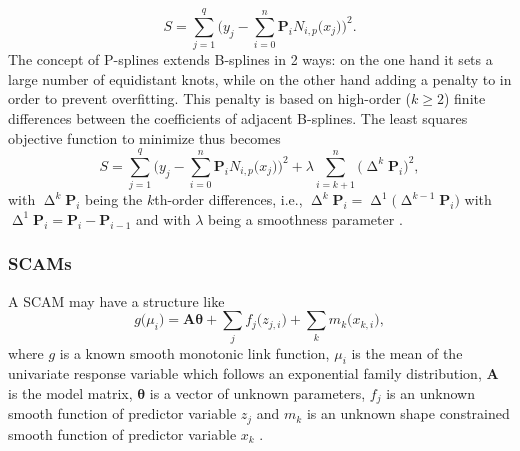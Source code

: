 \begin{equation}
  \label{eq:BSplineOLS}
  S =
  \sum_{j = 1}^q 
  \Biggl(
  y_j - \sum_{i = 0}^n \symbf{P}_i N_{i, p}\bigl(x_j\bigr)
  \Biggr)^2.
\end{equation}
The concept of P-splines extends B-splines in 2 ways: on the one hand it sets a large number of equidistant knots, while on the other hand adding a penalty to  in order to prevent overfitting.  This penalty is based on high-order (\(k \geq 2\)) finite differences between the coefficients of adjacent B-splines.  The least squares objective function to minimize thus becomes
\begin{equation}
  \label{eq:PSplineOLS}
  S =
  \sum_{j = 1}^q 
  \Biggl(
  y_j - \sum_{i = 0}^n \symbf{P}_i N_{i, p}\bigl(x_j\bigr)
  \Biggr)^2
  + \lambda \sum_{i = k + 1}^n \bigl(\upDelta^k \symbf{P}_i\bigr)^2,
\end{equation}
with \(\upDelta^k \symbf{P}_i\) being the \(k\)th-order differences, i.e., \(\upDelta^k\symbf{P}_i = \upDelta^1 \bigl(\upDelta^{k - 1} \symbf{P}_i\bigr)\) with \(\upDelta^1 \symbf{P}_i = \symbf{P}_i - \symbf{P}_{i - 1}\) and with \(\lambda\) being a smoothness parameter \parencite{Eilers1996, Bollaerts2006}.

\subsubsection{SCAMs}

A SCAM may have a structure like
\begin{equation}
  \label{eq:SCAM}
  g\bigl(\mu_i\bigr) = \symbf{A} \symbf{\theta} + \sum_j f_j\bigl(z_{j, i}\bigr) + \sum_k m_k\bigl(x_{k, i}\bigr),
\end{equation}
where \(g\) is a known smooth monotonic link function, \(\mu_i\) is the mean of the univariate response variable which follows an exponential family distribution, \(\symbf{A}\) is the model matrix, \(\symbf{\theta}\) is a vector of unknown parameters, \(f_j\) is an unknown smooth function of predictor variable \(z_j\) and \(m_k\) is an unknown shape constrained smooth function of predictor variable \(x_k\) \parencite{Pya2015}.


